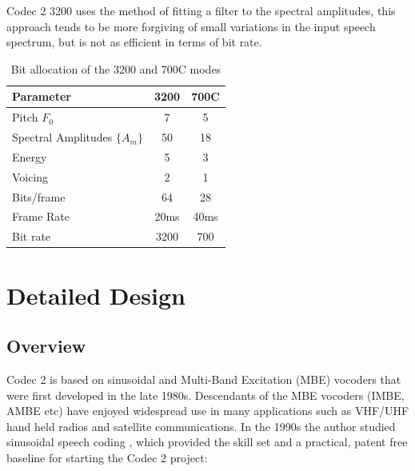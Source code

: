 \documentclass{article}
\begin{document}
{Codec 2 3200 uses the method of fitting a filter to the spectral amplitudes, this approach tends to be more forgiving of small variations in the input speech spectrum, but is not as efficient in terms of bit rate.

\begin{table}[H]
\label{tab:bit_allocation}
\centering
\begin{tabular}{l c c }
\hline
Parameter & 3200 & 700C \\
\hline
Pitch $F_0$ & 7 & 5 \\
Spectral Amplitudes $\{A_m\}$ & 50 & 18 \\
Energy & 5 & 3 \\
Voicing & 2 & 1 \\
Bits/frame & 64 & 28 \\
Frame Rate & 20ms & 40ms \\
Bit rate & 3200 & 700 \\
\hline
\end{tabular}
\caption{Bit allocation of the 3200 and 700C modes}
\end{table}

\section{Detailed Design}
\label{sect:details}

\subsection{Overview}

Codec 2 is based on sinusoidal \cite{mcaulay1986speech} and Multi-Band Excitation (MBE) \cite{griffin1988multiband} vocoders that were first developed in the late 1980s.  Descendants of the MBE vocoders (IMBE, AMBE etc) have enjoyed widespread use in many applications such as VHF/UHF hand held radios and satellite communications. In the 1990s the author studied sinusoidal speech coding \cite{rowe1997techniques}, which provided the skill set and a practical, patent free baseline for starting the Codec 2 project:

}
\end{document}
